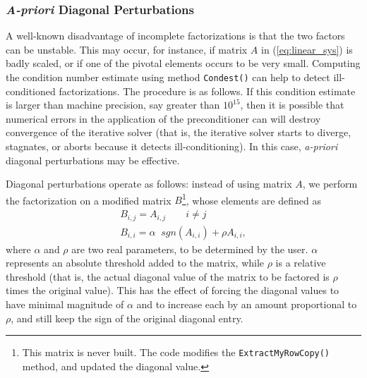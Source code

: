 \subsubsection{{\em A-priori} Diagonal Perturbations}
\label{sec:a-priori}

A well-known disadvantage of incomplete factorizations is that the two
factors can be unstable. This may occur, for instance, if matrix $A$ in
(\ref{eq:linear_sys}) is badly scaled, or if one of the pivotal elements
occurs to be very small. Computing the condition number estimate using method
{\tt Condest()} can help to
detect ill-conditioned factorizations.  The procedure is as follows. If this
condition estimate is larger than machine precision, say greater than
$10^{15}$, then it is possible that numerical errors in the application of the
preconditioner can will destroy convergence of the iterative solver (that is,
the iterative solver starts to diverge, stagnates, or aborts because it
detects ill-conditioning).  In this case, {\sl a-priori} diagonal
perturbations may be effective.  

Diagonal perturbations operate as follows:
instead of using matrix $A$, we perform the factorization  on 
a modified matrix $B$\footnote{This matrix is never built. The code modifies
  the {\tt ExtractMyRowCopy()} method, and updated the diagonal value.}, whose elements are defined as
\begin{equation}
\label{eq:B}
\begin{array}{lcr}
B_{i,j} = A_{i,j} \quad \quad i \neq j \\
B_{i,i} = \alpha \; \; sgn(A_{i,i}) + \rho A_{i,i},
  \end{array}
\end{equation}
where $\alpha$ and $\rho$ are two real parameters, to be determined by the
user. $\alpha$ represents an absolute threshold added to the matrix, while
$\rho$ is a relative threshold (that is, the actual diagonal value of the
matrix to be factored is $\rho$ times the original value).  This has the
effect of forcing the diagonal values to have minimal magnitude of $\alpha$
and to increase each by an amount proportional to $\rho$, and still keep the
sign of the original diagonal entry.

